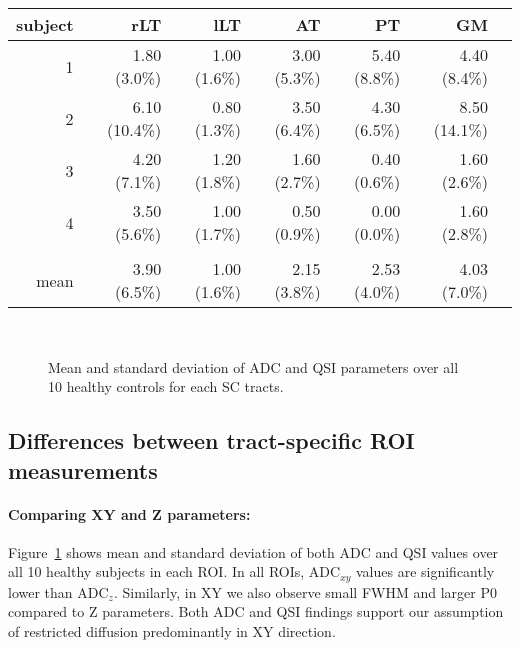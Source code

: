 \begin{table}[p]
\begin{tableframe}
\begin{adjustbox}{width={0.75\textwidth},keepaspectratio}
\begin{minipage}{\linewidth}
{\begin{minipage}{\linewidth}
\begin{tabular}{rrrrrrr}
	        \toprule
            subject & rLT   & lLT   & AT    & PT    & GM  \\
            \midrule
            1     & 1.80 (3.0\%) & 1.00 (1.6\%) & 3.00 (5.3\%) & 5.40 (8.8\%) & 4.40 (8.4\%) \\
            2     & 6.10 (10.4\%) & 0.80 (1.3\%) & 3.50 (6.4\%) & 4.30 (6.5\%) & 8.50 (14.1\%) \\
            3     & 4.20 (7.1\%) & 1.20 (1.8\%) & 1.60 (2.7\%) & 0.40 (0.6\%) & 1.60 (2.6\%) \\
            4     & 3.50 (5.6\%) & 1.00 (1.7\%) & 0.50 (0.9\%) & 0.00 (0.0\%) & 1.60 (2.8\%) \\
                  &       &       &       &       &   & \\
            mean  & 3.90 (6.5\%) & 1.00 (1.6\%) & 2.15 (3.8\%) & 2.53 (4.0\%) & 4.03 (7.0\%) \\
            \bottomrule
            \end{tabular}%
			\end{minipage}
			\label{tab:chapter6 scan rescan qsi}
        }
		\end{minipage}
		\end{adjustbox}	
\end{tableframe}
\end{table}
\begin{figure}[p]
      \centering
	  \\
	  \caption{Mean and standard deviation of ADC and QSI parameters over all 10 healthy controls for each SC tracts.}
      \label{fig:chapter6 ADC and QSI vals}
\end{figure}%
\subsection{Differences between tract-specific ROI measurements}
\label{par:chapter6 tract specific}
\paragraph{Comparing XY and Z parameters: }
Figure~\ref{fig:chapter6 ADC and QSI vals} shows mean and standard deviation of both \gls{ADC} and \gls{QSI} values over all 10 healthy subjects in each \gls{ROI}. In all ROIs, ADC$_{xy}$ values are significantly lower than ADC$_{z}$. Similarly, in XY we also observe small FWHM and larger P0 compared to Z parameters. Both ADC and QSI findings support our assumption of restricted diffusion predominantly in XY direction.


